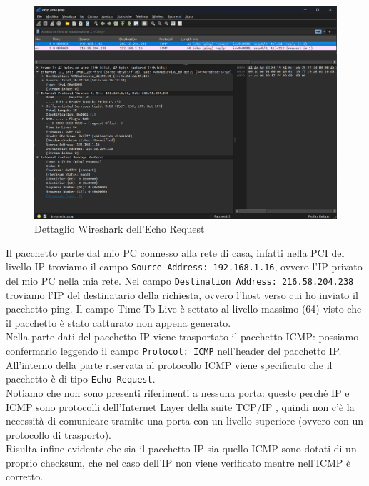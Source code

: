 \documentclass[12pt,a4paper]{report}
\begin{document}
\begin{figure}[H]
	\centering
	\includegraphics[width=1\textwidth]{icmp_echo_request}
 	\caption{Dettaglio Wireshark dell'Echo Request}
\end{figure}
Il pacchetto parte dal mio PC connesso alla rete di casa, infatti nella PCI del livello IP troviamo il campo \texttt{Source Address: 192.168.1.16}, ovvero l'IP privato del mio PC nella mia rete. Nel campo \texttt{Destination Address: 216.58.204.238} troviamo l'IP del destinatario della richiesta, ovvero l'host verso cui ho inviato il pacchetto ping. Il campo Time To Live è settato al livello massimo (64) visto che il pacchetto è stato catturato non appena generato.\\
Nella parte dati del pacchetto IP viene trasportato il pacchetto ICMP: possiamo confermarlo leggendo il campo \texttt{Protocol: ICMP} nell'header del pacchetto IP. All'interno della parte riservata al protocollo ICMP viene specificato che il pacchetto è di tipo \texttt{Echo Request}.\\
Notiamo che non sono presenti riferimenti a nessuna porta: questo perché IP e ICMP sono protocolli dell'Internet Layer della suite TCP/IP , quindi non c'è la necessità di comunicare tramite una porta con un livello superiore (ovvero con un protocollo di trasporto).\\
Risulta infine evidente che sia il pacchetto IP sia quello ICMP sono dotati di un proprio checksum, che nel caso dell'IP non viene verificato mentre nell'ICMP è corretto. 
\end{document}
